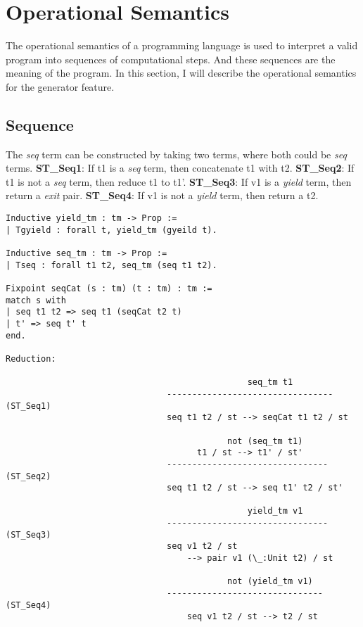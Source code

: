 \section{Operational Semantics}
\label{sec:os}
The operational semantics of a programming language is used to interpret a valid program into sequences of computational steps. And these sequences are the meaning of the program. In this section, I will describe the operational semantics for the generator feature.

\subsection{Sequence}
The \textit{seq} term can be constructed by taking two terms, where both could be \textit{seq} terms. 
\textbf{ST_Seq1}: If t1 is a \textit{seq} term, then concatenate t1 with t2. 
\textbf{ST_Seq2}: If t1 is not a \textit{seq} term, then reduce t1 to t1'. 
\textbf{ST_Seq3}: If v1 is a \textit{yield} term, then return a \textit{exit} pair. 
\textbf{ST_Seq4}: If v1 is not a \textit{yield} term, then return a t2.
\begin{lstlisting}
Inductive yield_tm : tm -> Prop :=
| Tgyield : forall t, yield_tm (gyeild t).

Inductive seq_tm : tm -> Prop :=
| Tseq : forall t1 t2, seq_tm (seq t1 t2).

Fixpoint seqCat (s : tm) (t : tm) : tm :=
match s with
| seq t1 t2 => seq t1 (seqCat t2 t)
| t' => seq t' t
end.

Reduction:

									    		seq_tm t1
								---------------------------------  (ST_Seq1)
								seq t1 t2 / st --> seqCat t1 t2 / st
								
											not (seq_tm t1)
									  t1 / st --> t1' / st'
								--------------------------------   (ST_Seq2)
								seq t1 t2 / st --> seq t1' t2 / st'
								
												yield_tm v1
								--------------------------------   (ST_Seq3)
								seq v1 t2 / st 
									--> pair v1 (\_:Unit t2) / st
								
											not (yield_tm v1)
								-------------------------------  (ST_Seq4)
									seq v1 t2 / st --> t2 / st

\end{lstlisting}

